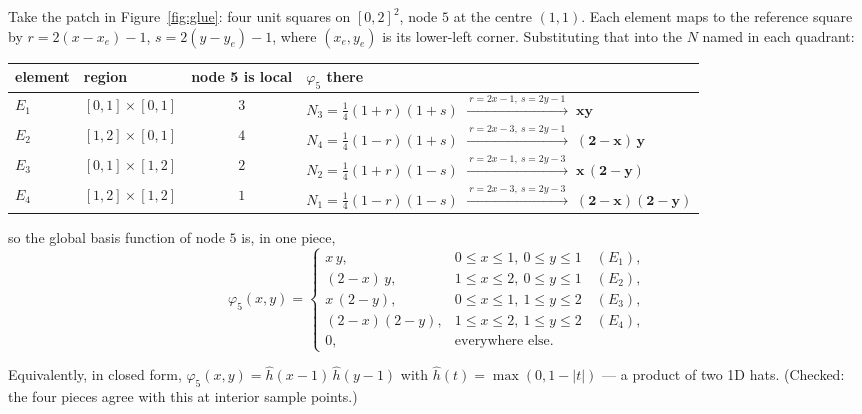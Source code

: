 \documentclass[11pt]{article}
\begin{document}
Take the patch in Figure~\ref{fig:glue}: four unit squares on $[0,2]^{2}$, node $5$ at the
centre $(1,1)$. Each element maps to the reference square by
$r=2(x-x_{e})-1$, $s=2(y-y_{e})-1$, where $(x_{e},y_{e})$ is its lower-left
corner. Substituting that into the $N$ named in each quadrant:

\begin{center}\small
\renewcommand{\arraystretch}{1.45}
\begin{tabular}{@{}llcl@{}}
\toprule
element & region & node 5 is local & $\varphi_{5}$ there\\
\midrule
$E_{1}$ & $[0,1]\times[0,1]$ & $3$ & $N_{3}=\tfrac14(1+r)(1+s)
   \;\xrightarrow{\;r=2x-1,\ s=2y-1\;}\; \bm{xy}$\\
$E_{2}$ & $[1,2]\times[0,1]$ & $4$ & $N_{4}=\tfrac14(1-r)(1+s)
   \;\xrightarrow{\;r=2x-3,\ s=2y-1\;}\; \bm{(2-x)\,y}$\\
$E_{3}$ & $[0,1]\times[1,2]$ & $2$ & $N_{2}=\tfrac14(1+r)(1-s)
   \;\xrightarrow{\;r=2x-1,\ s=2y-3\;}\; \bm{x\,(2-y)}$\\
$E_{4}$ & $[1,2]\times[1,2]$ & $1$ & $N_{1}=\tfrac14(1-r)(1-s)
   \;\xrightarrow{\;r=2x-3,\ s=2y-3\;}\; \bm{(2-x)(2-y)}$\\
\bottomrule
\end{tabular}
\label{tab:phi5}
\end{center}

\noindent
so the global basis function of node $5$ is, in one piece,
\begin{equation}\label{eq:phiexplicit}
  \boxed{\;
  \varphi_{5}(x,y)=
  \begin{cases}
    x\,y, & 0\le x\le1,\ 0\le y\le1 \quad (E_{1}),\\[2pt]
    (2-x)\,y, & 1\le x\le2,\ 0\le y\le1 \quad (E_{2}),\\[2pt]
    x\,(2-y), & 0\le x\le1,\ 1\le y\le2 \quad (E_{3}),\\[2pt]
    (2-x)(2-y), & 1\le x\le2,\ 1\le y\le2 \quad (E_{4}),\\[2pt]
    0, & \text{everywhere else.}
  \end{cases}\;}
\end{equation}

\noindent
Equivalently, in closed form, $\varphi_{5}(x,y)=\hat{h}(x-1)\,\hat{h}(y-1)$ with
$\hat{h}(t)=\max(0,1-|t|)$ --- a product of two 1D hats. (Checked: the four
pieces agree with this at interior sample points.)
\end{document}
